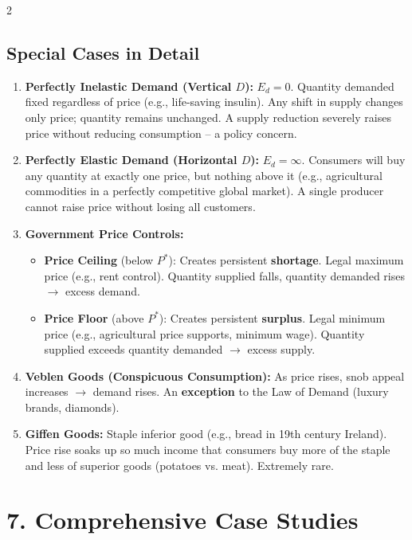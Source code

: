\documentclass[10pt,a4paper]{article}
\begin{document}
\begin{multicols}{2}
\subsection*{Special Cases in Detail}
\begin{enumerate}[leftmargin=*,nosep]
    \item \textbf{Perfectly Inelastic Demand (Vertical $D$):} $E_d = 0$. Quantity demanded fixed regardless of price (e.g., life-saving insulin). Any shift in supply changes only price; quantity remains unchanged. A supply reduction severely raises price without reducing consumption -- a policy concern.
    \item \textbf{Perfectly Elastic Demand (Horizontal $D$):} $E_d = \infty$. Consumers will buy any quantity at exactly one price, but nothing above it (e.g., agricultural commodities in a perfectly competitive global market). A single producer cannot raise price without losing all customers.
    \item \textbf{Government Price Controls:}
    \begin{itemize}[nosep]
        \item \textbf{Price Ceiling} (below $P^*$): Creates persistent \textbf{shortage}. Legal maximum price (e.g., rent control). Quantity supplied falls, quantity demanded rises $\to$ excess demand.
        \item \textbf{Price Floor} (above $P^*$): Creates persistent \textbf{surplus}. Legal minimum price (e.g., agricultural price supports, minimum wage). Quantity supplied exceeds quantity demanded $\to$ excess supply.
    \end{itemize}
    \item \textbf{Veblen Goods (Conspicuous Consumption):} As price rises, snob appeal increases $\to$ demand rises. An \textbf{exception} to the Law of Demand (luxury brands, diamonds).
    \item \textbf{Giffen Goods:} Staple inferior good (e.g., bread in 19th century Ireland). Price rise soaks up so much income that consumers buy more of the staple and less of superior goods (potatoes vs. meat). Extremely rare.
\end{enumerate}

\section*{7. Comprehensive Case Studies}


\end{multicols}
\end{document}
